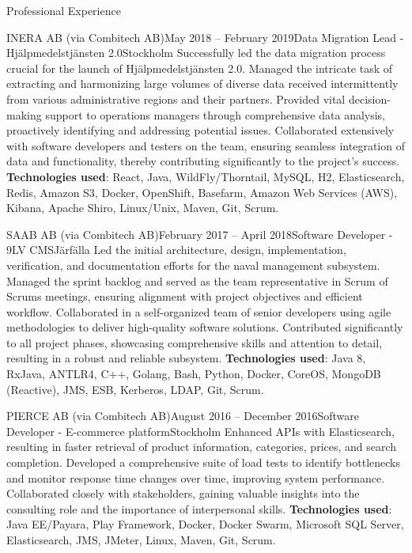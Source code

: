 \documentclass{resume}
\begin{document}
\begin{rSection}{Professional Experience}
\begin{rClientSubsection}{INERA AB (via Combitech AB)}{May 2018 -- February 2019}{Data Migration Lead - Hjälpmedelstjänsten 2.0}{Stockholm}
\bItem Successfully led the data migration process crucial for the launch of Hjälpmedelstjänsten 2.0.
\bItem Managed the intricate task of extracting and harmonizing large volumes of diverse data received intermittently from various administrative regions and their partners.
\bItem Provided vital decision-making support to operations managers through comprehensive data analysis, proactively identifying and addressing potential issues.
\bItem Collaborated extensively with software developers and testers on the team, ensuring seamless integration of data and functionality, thereby contributing significantly to the project's success.
\bItem \textbf{Technologies used}: React, Java, WildFly/Thorntail, MySQL, H2, Elasticsearch, Redis, Amazon S3, Docker, OpenShift, Basefarm, Amazon Web Services (AWS), Kibana, Apache Shiro, Linux/Unix, Maven, Git, Scrum.
\end{rClientSubsection}

\begin{rClientSubsection}{SAAB AB (via Combitech AB)}{February 2017 -- April 2018}{Software Developer - 9LV CMS}{Järfälla}
\bItem Led the initial architecture, design, implementation, verification, and documentation efforts for the naval management subsystem.
\bItem Managed the sprint backlog and served as the team representative in Scrum of Scrums meetings, ensuring alignment with project objectives and efficient workflow.
\bItem Collaborated in a self-organized team of senior developers using agile methodologies to deliver high-quality software solutions.
\bItem Contributed significantly to all project phases, showcasing comprehensive skills and attention to detail, resulting in a robust and reliable subsystem.
\bItem \textbf{Technologies used}: Java 8, RxJava, ANTLR4, C++, Golang, Bash, Python, Docker, CoreOS, MongoDB (Reactive), JMS, ESB, Kerberos, LDAP, Git, Scrum.
\end{rClientSubsection}

\begin{rClientSubsection}{PIERCE AB (via Combitech AB)}{August 2016 -- December 2016}{Software Developer - E-commerce platform}{Stockholm}
\bItem Enhanced APIs with Elasticsearch, resulting in faster retrieval of product information, categories, prices, and search completion.
\bItem Developed a comprehensive suite of load tests to identify bottlenecks and monitor response time changes over time, improving system performance.
\bItem Collaborated closely with stakeholders, gaining valuable insights into the consulting role and the importance of interpersonal skills.
\bItem \textbf{Technologies used}: Java EE/Payara, Play Framework, Docker, Docker Swarm, Microsoft SQL Server, Elasticsearch, JMS, JMeter, Linux, Maven, Git, Scrum.
\end{rClientSubsection}


\end{rSection}
\end{document}
